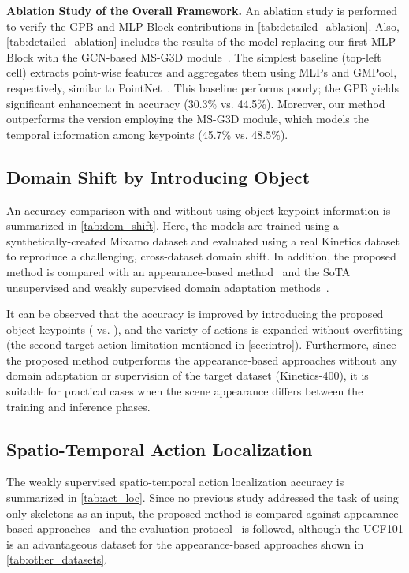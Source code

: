 \documentclass[10pt,twocolumn,letterpaper]{article}
\begin{document}
\noindent \textbf{Ablation Study of the Overall Framework.} 
An ablation study is performed to verify the GPB and MLP Block contributions in \cref{tab:detailed_ablation}.
Also, \cref{tab:detailed_ablation} includes the results of the model replacing our first MLP Block with the GCN-based MS-G3D module~\cite{Liu2020CVPR}.
The simplest baseline (top-left cell) extracts point-wise features and aggregates them using MLPs and GMPool, respectively, similar to PointNet~\cite{Qi2017CVPR}. 
This baseline performs poorly; the GPB yields significant enhancement in accuracy (30.3\% vs. 44.5\%).
Moreover, our method outperforms the version employing the MS-G3D module, which models the temporal information among keypoints (45.7\% vs. 48.5\%).

\subsection{Domain Shift by Introducing Object}
 \label{sec:domain_shift}
An accuracy comparison with and without using object keypoint information is summarized in \cref{tab:dom_shift}.
Here, the models are trained using a synthetically-created Mixamo dataset and evaluated using a real Kinetics dataset to reproduce a challenging, cross-dataset domain shift.
In addition, the proposed method is compared with an appearance-based method~\cite{Carreira2017CVPR} and the SoTA unsupervised and weakly supervised domain adaptation methods~\cite{Chen2019ICCV,Costa2022WACV}.

It can be observed that the accuracy is improved by introducing the proposed object keypoints ( vs. ), and the variety of actions is expanded without overfitting (the second target-action limitation mentioned in \cref{sec:intro}).
Furthermore, since the proposed method outperforms the appearance-based approaches without any domain adaptation or supervision of the target dataset (Kinetics-400), it is suitable for practical cases when the scene appearance differs between the training and inference phases.


\subsection{Spatio-Temporal Action Localization}
The weakly supervised spatio-temporal action localization accuracy is summarized in \cref{tab:act_loc}.
Since no previous study addressed the task of using only skeletons as an input, the proposed method is compared against appearance-based approaches~\cite{Victor2020CVIU,Cheron2018Neurips,Anurag2020ECCV} and the evaluation protocol~\cite{Anurag2020ECCV} is followed, although the UCF101 is an advantageous dataset for the appearance-based approaches shown in \cref{tab:other_datasets}.
\end{document}
